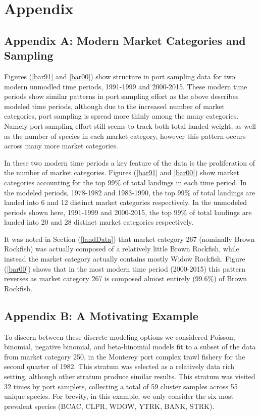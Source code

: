 \documentclass[12pt]{article}
\begin{document}
%
%
\section{Appendix}\label{appendix}
%
%

\subsection{Appendix A: Modern Market Categories and Sampling}\label{appData}

Figures (\ref{bar91} and \ref{bar00}) show structure in port sampling data for 
two modern unmodled time periods, 1991-1999 and 2000-2015. These modern 
time periods show similar patterns in port sampling effort as the 
above describes modeled time periods, although due to the increased number 
of market categories, port sampling is spread more thinly among the 
many categories. Namely port sampling effort still seems to track both 
total landed weight, as well as the number of species in each market 
category, however this pattern occurs across many more market categories.

In these two modern time periods a key feature of the data is the
proliferation of the number of market categories. Figures (\ref{bar91} and 
\ref{bar00}) show market categories accounting for the top 99\% of total
landings in each time period. In the modeled periods, 1978-1982 and
1983-1990, the top 99\% of total landings are landed into 6 and 12
distinct market categories respectively. In the unmodeled periods shown
here, 1991-1999 and 2000-2015, the top 99\% of total landings are landed
into 20 and 28 distinct market categories respectively.

It was noted in Section (\ref{landData}) that market category 267 (nominally 
Brown Rockfish) was actually composed of a relatively little Brown Rockfish, 
while instead the market category actually contains mostly Widow Rockfish. 
Figure (\ref{bar00}) shows that in the most modern time period (2000-2015) 
this pattern reverses as market category 267 is composed almost entirely 
(99.6\%) of Brown Rockfish.

\subsection{Appendix B: A Motivating Example}\label{appLike}

To discern between these discrete modeling options we considered
Poisson, binomial, negative binomial, and beta-binomial models fit to a
subset of the data from market category 250, in the Monterey port complex trawl
fishery for the second quarter of 1982. This stratum was selected as a
relatively data rich setting, although other stratum produce similar
results. This stratum was visited 32 times by port samplers, collecting
a total of 59 cluster samples across 55 unique species. For brevity, in
this example, we only consider the six most prevalent species (BCAC,
CLPR, WDOW, YTRK, BANK, STRK).
\end{document}
